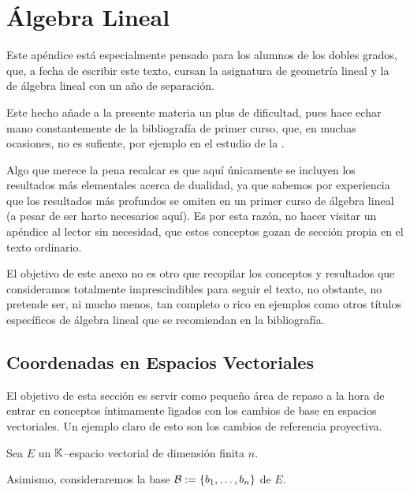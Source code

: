\chapter{Álgebra Lineal}
\label{A}
Este apéndice está especialmente pensado para los alumnos de los dobles grados, que, a fecha de escribir este texto, cursan la asignatura de geometría lineal y la de álgebra lineal con un año de separación.

Este hecho añade a la presente materia un plus de dificultad, pues hace echar mano constantemente de la bibliografía de primer curso, que, en muchas ocasiones, no es sufiente, por ejemplo en el estudio de la .

Algo que merece la pena recalcar es que aquí únicamente se incluyen los resultados más elementales acerca de dualidad, ya que sabemos por experiencia que los resultados más profundos se omiten en un primer curso de álgebra lineal (a pesar de ser harto necesarios aquí). Es por esta razón, no hacer visitar un apéndice al lector sin necesidad, que estos conceptos gozan de sección propia en el texto ordinario.

El objetivo de este anexo no es otro que recopilar los conceptos y resultados que consideramos totalmente imprescindibles para seguir el texto, no obstante, no pretende ser, ni mucho menos, tan completo o rico en ejemplos como otros títulos específicos de álgebra lineal que se recomiendan en la bibliografía.
\section{Coordenadas en Espacios Vectoriales}
El objetivo de esta sección es servir como pequeño área de repaso a la hora de entrar en conceptos íntimamente ligados con los cambios de base en espacios vectoriales. Un ejemplo claro de esto son los cambios de referencia proyectiva.

Sea $E$ un $\mathbb{K}$--espacio vectorial de dimensión finita $n$.

Asimismo, consideraremos la base $\mathcal{B}:=\{b_1,\dots,b_n\}$ de $E$.

